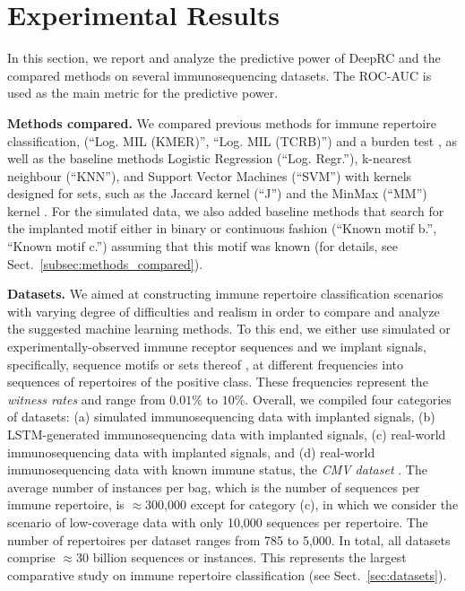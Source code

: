 \documentclass[oneside]{book}
\begin{document}
%


\vspace{\cheatspace}
\section*{Experimental Results}
\vspace{\cheatspace}
\label{sec:results}
%
In this section, we report and analyze the predictive power of DeepRC and the 
compared methods on several immunosequencing datasets. %
The ROC-AUC is used as the main metric for the predictive 
power.
%




\textbf{Methods compared.} We compared previous methods
for immune repertoire classification, \citep{ostmeyer2019biophysicochemical} 
(``Log. MIL (KMER)'', ``Log. MIL (TCRB)'') and a burden 
test \citep{emerson2017immunosequencing}, 
as well as the baseline methods Logistic Regression (``Log. Regr.''), 
k-nearest neighbour (``KNN''), and Support Vector Machines (``SVM'') 
with kernels designed for sets, such as the Jaccard kernel (``J'')
and the MinMax (``MM'') kernel \citep{ralaivola2005graph}. For the simulated
data, we also added baseline methods that search for the implanted
motif either in binary or continuous fashion (``Known motif b.'', ``Known motif c.'') 
assuming that this motif was known (for details, see Sect.~\ref{subsec:methods_compared}).
%

\textbf{Datasets.}
%
We aimed at constructing 
immune repertoire classification 
scenarios with varying degree of difficulties and 
realism in order to compare and analyze
the suggested machine learning methods.
To this end, we either use
simulated or experimentally-observed immune receptor sequences and we implant signals,
specifically, sequence motifs or sets thereof \citep{akbar2019compact, weber2019immunesim}, at different 
frequencies into sequences of repertoires of the positive class. 
These frequencies represent the \emph{witness rates} and range from
$0.01\%$ to $10\%$. Overall, we compiled four categories of datasets:
(a) simulated immunosequencing data with implanted signals,
(b) LSTM-generated immunosequencing data with implanted signals,
(c) real-world immunosequencing data with implanted signals, and 
(d) real-world immunosequencing data with known immune status, the \emph{CMV dataset} \citep{emerson2017immunosequencing}.
The average number of instances per bag, which is the number of sequences per immune repertoire,
is $\approx$300,000 except for category (c), in which 
we consider the scenario of low-coverage data with only 10,000
sequences per repertoire. The number of repertoires 
per dataset ranges from 785 to 5,000. In total, all datasets 
comprise $\approx$30 billion sequences or instances. This represents the 
largest comparative study on immune repertoire classification (see Sect.~\ref{sec:datasets}).
%
\end{document}
